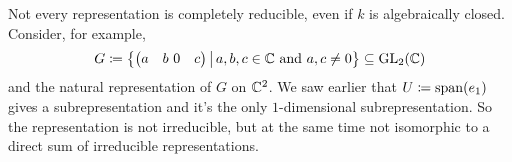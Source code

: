\begin{remark}
  Not every representation is completely reducible, even if $k$ is algebraically closed.
  Consider, for example,
  \[
    G
    \coloneqq \left\{
                \begin{pmatrix}
                  a & b \
                  0 & c
                \end{pmatrix}
              \,\middle|\,
                a, b, c \in \mathbb{C}
                \text{ and }
                a,c \neq 0
              \right\}
    \subseteq \operatorname{GL}_2(\mathbb{C})
  \]
  and the natural representation of $G$ on $\mathbb{C}^2$. We saw earlier that $U \coloneqq \operatorname{span}(e_1)$ gives a subrepresentation and it’s the only $1$-dimensional subrepresentation.
  So the representation is not irreducible, but at the same time not isomorphic to a direct sum of irreducible representations.
\end{remark}


